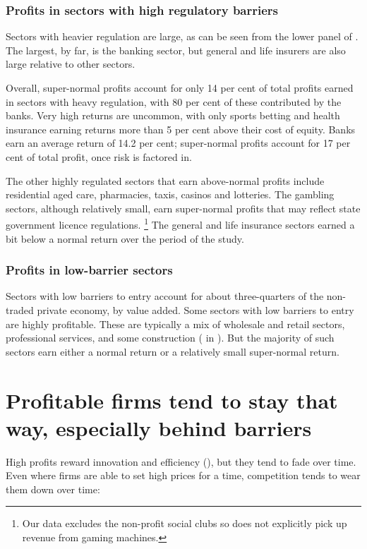 \subsubsection{Profits in sectors with high regulatory barriers}

Sectors with heavier regulation are large, as can be seen from the lower panel of . The largest, by far, is the banking sector, but general and life insurers are also large relative to other sectors.

Overall, super-normal profits account for only 14 per cent of total profits earned in sectors with heavy regulation, with 80 per cent of these contributed by the banks.
Very high returns are uncommon, with only sports betting and health insurance earning returns more than 5 per cent above their cost of equity.
Banks earn an average return of 14.2 per cent; super-normal profits account for 17 per cent of total profit, once risk is factored in. 

The other highly regulated sectors that earn above-normal profits include residential aged care, pharmacies, taxis, casinos and lotteries. The gambling sectors, although relatively small, earn super-normal profits that may reflect state government licence regulations.%
    \footnote{Our data excludes the non-profit social clubs so does not explicitly pick up revenue from gaming machines.}
The general and life insurance sectors earned a bit below a normal return over the period of the study. 

\subsubsection{Profits in low-barrier sectors}

Sectors with low barriers to entry account for about three-quarters of the non-traded private economy, by value added. Some sectors with low barriers to entry are highly profitable. These are typically a mix of wholesale and retail sectors, professional services, and some construction ( in ).
But the majority of such sectors earn either a normal return or a relatively small super-normal return.

\section{Profitable firms tend to stay that way, especially behind barriers}

High profits reward innovation and efficiency (), but they tend to fade over time. 
Even where firms are able to set high prices for a time, competition tends to wear them down over time:

